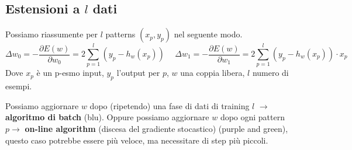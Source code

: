 \subsection{Estensioni a $l$ dati}
\begin{definition}
    Possiamo riassumente per $l$ patterns $(x_p, y_p)$ nel seguente modo.
    $$\Delta w_0 = - \frac{\partial E(w)}{\partial w_0} = 2 \sum_{p=1}^{l}(y_p - h_w(x_p)) \hspace{15pt} \Delta w_1 = -\frac{\partial E(w)}{\partial w_1} = 2 \sum_{p=1}^{l}(y_p - h_w(x_p)) \cdot x_p$$
    Dove $x_p$ è un p-esmo input, $y_p$ l'output per $p$, $w$ una coppia libera, $l$ numero di esempi.
\end{definition}
\hspace{-15pt}Possiamo aggiornare $w$ dopo (ripetendo) una fase di dati di training $l$ $\to$ \textbf{algoritmo di batch} (blu). Oppure
possiamo aggiornare $w$ dopo ogni pattern $p \to$ \textbf{on-line algorithm} (discesa del gradiente stocastico) (purple and green), questo caso 
potrebbe essere più veloce, ma necessitare di step più piccoli.


